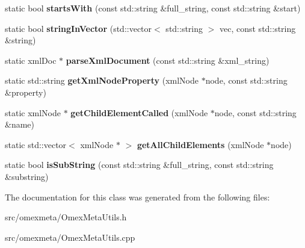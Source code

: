 \begin{DoxyCompactItemize}
\item 
\mbox{\label{classomexmeta_1_1OmexMetaUtils_a66d58e0ebcbee1857b23ead70c87de7f}} 
static bool {\bfseries starts\+With} (const std\+::string \&full\+\_\+string, const std\+::string \&start)
\item 
\mbox{\label{classomexmeta_1_1OmexMetaUtils_a6f8e406b8798bd2f1f0ae0d1bd07ed2b}} 
static bool {\bfseries string\+In\+Vector} (std\+::vector$<$ std\+::string $>$ vec, const std\+::string \&string)
\item 
\mbox{\label{classomexmeta_1_1OmexMetaUtils_a718710d8ba7fc7598bd73a5456b3d903}} 
static xml\+Doc $\ast$ {\bfseries parse\+Xml\+Document} (const std\+::string \&xml\+\_\+string)
\item 
\mbox{\label{classomexmeta_1_1OmexMetaUtils_a29cc8222c809162eadbc424a0687cbf3}} 
static std\+::string {\bfseries get\+Xml\+Node\+Property} (xml\+Node $\ast$node, const std\+::string \&property)
\item 
\mbox{\label{classomexmeta_1_1OmexMetaUtils_a1dbcd874b2b72531e7f4f9e82524d8e8}} 
static xml\+Node $\ast$ {\bfseries get\+Child\+Element\+Called} (xml\+Node $\ast$node, const std\+::string \&name)
\item 
\mbox{\label{classomexmeta_1_1OmexMetaUtils_a4d6f7d2140c42435be9339edf975b949}} 
static std\+::vector$<$ xml\+Node $\ast$ $>$ {\bfseries get\+All\+Child\+Elements} (xml\+Node $\ast$node)
\item 
\mbox{\label{classomexmeta_1_1OmexMetaUtils_a96e93667c8799b9569cb30fc102b129b}} 
static bool {\bfseries is\+Sub\+String} (const std\+::string \&full\+\_\+string, const std\+::string \&substring)
\end{DoxyCompactItemize}


The documentation for this class was generated from the following files\+:\begin{DoxyCompactItemize}
\item 
src/omexmeta/Omex\+Meta\+Utils.\+h\item 
src/omexmeta/Omex\+Meta\+Utils.\+cpp\end{DoxyCompactItemize}
